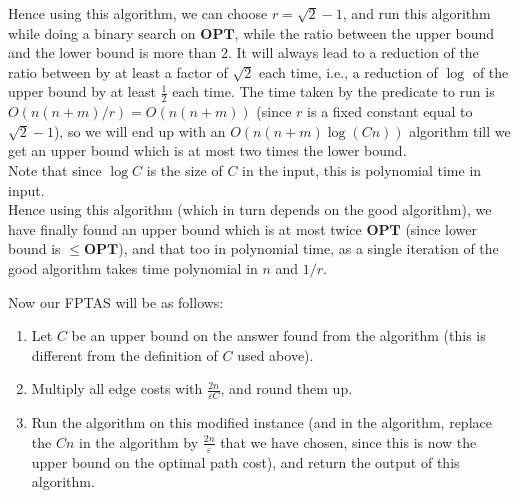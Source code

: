 \documentclass[a4paper]{article}
\newcommand{\nl}{\vspace{0.2cm}\\}
\newcommand{\eps}{\varepsilon}
\newcommand{\OPT}{\mathbf{OPT}}
\begin{document}
Hence using this algorithm, we can choose $r = {\sqrt{2}} - 1$, and run this algorithm while doing a binary search on $\OPT$, while the ratio between the upper bound and the lower bound is
more than $2$. It will always lead to a reduction of the ratio between by at least a factor of $\sqrt{2}$ each time, i.e., a reduction of $\log$ of the upper bound by at least $\frac{1}{2}$ each time.
The time taken by the predicate to run is $O(n(n + m) / r) = O(n(n + m))$ (since $r$ is a fixed constant equal to $\sqrt{2} - 1$), so we will end up with an $O(n(n + m) \log (Cn))$ algorithm till we get an upper bound which is at most two times the lower bound.\nl
Note that since $\log C$ is the size of $C$ in the input, this is polynomial time in input.\nl
Hence using this algorithm (which in turn depends on the good algorithm), we have finally found an upper bound which is at most twice $\OPT$ (since lower bound is $\le \OPT$), and that too in
polynomial time, as a single iteration of the good algorithm takes time polynomial in $n$ and $1/r$.

Now our FPTAS will be as follows:

\begin{enumerate}
    \item Let $C$ be an upper bound on the answer found from the algorithm (this is different from the definition of $C$ used above).
    \item Multiply all edge costs with $\frac{2n}{\eps C}$, and round them up.
    \item Run the algorithm on this modified instance (and in the algorithm, replace the $Cn$ in the algorithm by $\frac{2n}{\eps}$ that we have chosen, since this is now the upper bound on the
        optimal path cost), and return the output of this algorithm.
\end{enumerate}
\end{document}
